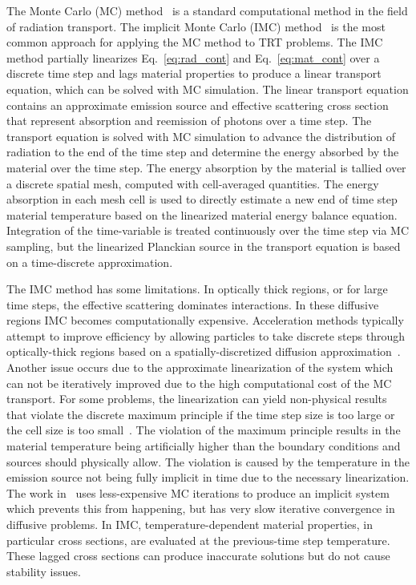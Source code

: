 The Monte Carlo (MC) method~\cite{shultis_mc} is a standard computational method in
the field of radiation transport.
 The implicit Monte Carlo (IMC) method~\cite{fnc}
is the most common approach for applying the MC method to TRT problems. The IMC
method partially linearizes Eq.~\eqref{eq:rad_cont} and Eq.~\eqref{eq:mat_cont} over a discrete time
step and lags material properties to produce a linear transport equation, which can be solved with MC
simulation.  The linear transport equation contains an approximate emission source
and effective scattering cross section that represent
absorption and reemission of photons over a time step.  The transport equation is
solved with MC simulation 
to advance the distribution of radiation to the end of the time step and determine
the energy absorbed by the material over the time step.  The energy absorption by
the material is tallied over a discrete spatial mesh, computed with cell-averaged
quantities.
  The energy absorption in each mesh cell is used to directly estimate
a new end of time step material temperature based on the linearized material
energy balance equation. Integration of the
time-variable is treated continuously over the time step via MC sampling, but the
linearized Planckian source in the transport equation is based on a time-discrete
approximation.
  

The IMC method has some limitations.  In optically thick regions, or for
large time steps, the
effective scattering dominates interactions.  In these diffusive regions IMC
becomes computationally expensive. Acceleration methods typically attempt to improve
efficiency by allowing particles to take discrete steps through optically-thick
regions based on a spatially-discretized diffusion approximation~\cite{imd,ddmc}. 
Another issue occurs due to the approximate linearization of the system which can not
be iteratively improved due
to the high computational cost of the MC transport.  For some problems, the
linearization can yield non-physical results that violate the discrete maximum
principle if the time step size is too large or the cell size is too
small~\cite{wollaber2013discrete}.  The violation of the maximum principle results in
the material temperature being artificially higher than the boundary conditions and
sources should physically allow.  The violation is caused by the temperature in the
emission source not being fully implicit in time due to the necessary linearization.
The work in~\cite{iimc_gentile} uses less-expensive MC iterations to produce an implicit system
which prevents this from happening, but has very slow iterative convergence in diffusive
problems.  
In IMC, temperature-dependent
material properties, in particular cross sections, are evaluated at the previous-time
step temperature. These lagged cross sections can produce inaccurate solutions but
do not cause stability issues.  


